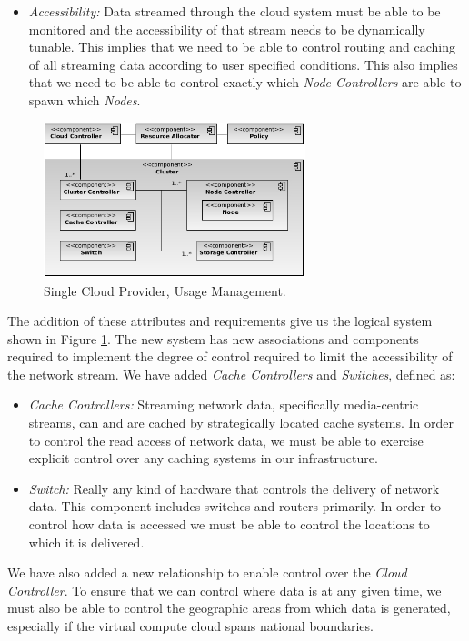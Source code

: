 \documentclass[times, 10pt,twocolumn]{article}
\begin{document}
\begin{itemize}
\item \textit{Accessibility:} Data streamed through the cloud system must be able to be monitored and the accessibility of that stream needs to be dynamically tunable.  This implies that we need to be able to control routing and caching of all streaming data according to user specified conditions.  This also implies that we need to be able to control exactly which \textit{Node Controllers} are able to spawn which \textit{Nodes}.
\end{itemize}

\begin{figure}[!t]
\centering
\includegraphics[width=3in]{Single-UM}
\caption{Single Cloud Provider, Usage Management.}
\label{fig:single-um}
\end{figure}

The addition of these attributes and requirements give us the logical system shown in Figure \ref{fig:single-um}.  The new system has new associations and components required to implement the degree of control required to limit the accessibility of the network stream.  We have added \textit{Cache Controllers} and \textit{Switches}, defined as:

\begin{itemize}
\item \textit{Cache Controllers:} Streaming network data, specifically media-centric streams, can and are cached by strategically located cache systems.  In order to control the read access of network data, we must be able to exercise explicit control over any caching systems in our infrastructure.
\item \textit{Switch:} Really any kind of hardware that controls the delivery of network data.  This component includes switches and routers primarily.  In order to control how data is accessed we must be able to control the locations to which it is delivered.
\end{itemize}

We have also added a new relationship to enable control over the \textit{Cloud Controller}.  To ensure that we can control where data is at any given time, we must also be able to control the geographic areas from which data is generated, especially if the virtual compute cloud spans national boundaries.
\end{document}
